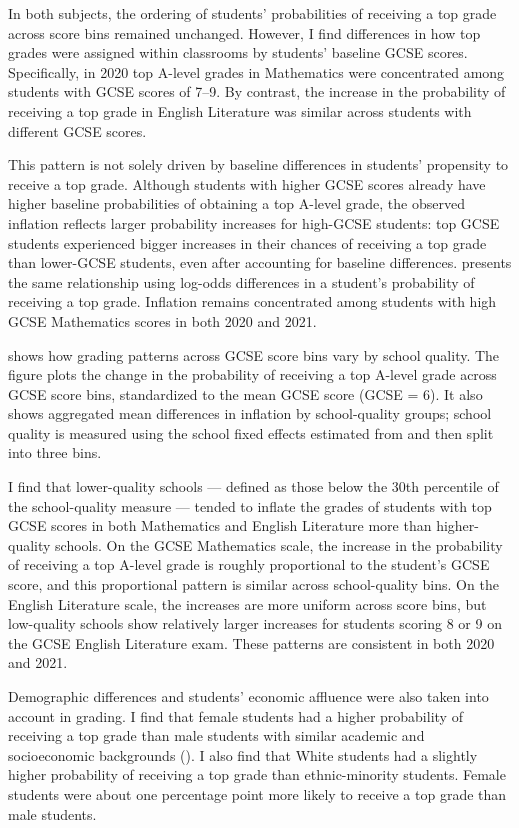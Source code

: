 In both subjects, the ordering of students' probabilities of receiving a top grade across score bins remained unchanged. However, I find differences in how top grades were assigned within classrooms by students' baseline GCSE scores. Specifically, in 2020 top A-level grades in Mathematics were concentrated among students with GCSE scores of 7–9. By contrast, the increase in the probability of receiving a top grade in English Literature was similar across students with different GCSE scores.

This pattern is not solely driven by baseline differences in students' propensity to receive a top grade. Although students with higher GCSE scores already have higher baseline probabilities of obtaining a top A-level grade, the observed inflation reflects larger probability increases for high-GCSE students: top GCSE students experienced bigger increases in their chances of receiving a top grade than lower-GCSE students, even after accounting for baseline differences.  presents the same relationship using log-odds differences in a student's probability of receiving a top grade. Inflation remains concentrated among students with high GCSE Mathematics scores in both 2020 and 2021.

 shows how grading patterns across GCSE score bins vary by school quality. The figure plots the change in the probability of receiving a top A-level grade across GCSE score bins, standardized to the mean GCSE score (GCSE = 6). It also shows aggregated mean differences in inflation by school-quality groups; school quality is measured using the school fixed effects estimated from  and then split into three bins.

I find that lower-quality schools — defined as those below the 30th percentile of the school-quality measure — tended to inflate the grades of students with top GCSE scores in both Mathematics and English Literature more than higher-quality schools. On the GCSE Mathematics scale, the increase in the probability of receiving a top A-level grade is roughly proportional to the student's GCSE score, and this proportional pattern is similar across school-quality bins. On the English Literature scale, the increases are more uniform across score bins, but low-quality schools show relatively larger increases for students scoring 8 or 9 on the GCSE English Literature exam. These patterns are consistent in both 2020 and 2021.

Demographic differences and students' economic affluence were also taken into account in grading. I find that female students had a higher probability of receiving a top grade than male students with similar academic and socioeconomic backgrounds (). I also find that White students had a slightly higher probability of receiving a top grade than ethnic-minority students. Female students were about one percentage point more likely to receive a top grade than male students.


